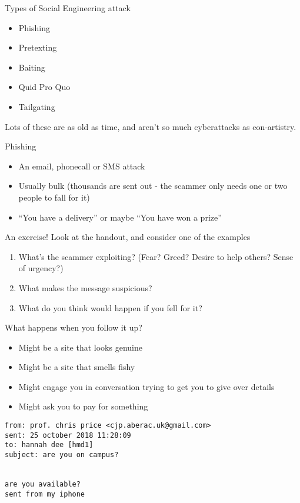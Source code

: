 \documentclass[xcolor=table]{beamer}
\begin{document}
\begin{frame}{Types of Social Engineering attack}
	\begin{itemize}
		\item Phishing
		\item Pretexting
		\item Baiting
		\item Quid Pro Quo
		\item Tailgating
	\end{itemize}
	Lots of these are as old as time, and aren't so much cyberattacks as con-artistry.
\end{frame}

\begin{frame}{Phishing}
	\begin{itemize}
		\item An email, phonecall or SMS attack
		\item Usually bulk (thousands are sent out - the scammer only needs one or two people to fall for it)
		\item ``You have a delivery'' or maybe ``You have won a prize''
	\end{itemize}
\end{frame}

\begin{frame}{An exercise!}
	Look at the handout, and consider one of the examples
	\begin{enumerate}
		\item What's the scammer exploiting? (Fear? Greed? Desire to help others? Sense of urgency?)
		\item What makes the message suspicious?
		\item What do you think would happen if you fell for it?
	\end{enumerate}

\end{frame}
\begin{frame}{What happens when you follow it up?}
	\begin{itemize}
		\item Might be a site that looks genuine
		\item Might be a site that smells fishy
		\item Might engage you in conversation trying to get you to give over details
		\item Might ask you to pay for something
	\end{itemize}
\end{frame}

\begin{frame}[fragile]
\begin{small}
	\begin{verbatim}
from: prof. chris price <cjp.aberac.uk@gmail.com>
sent: 25 october 2018 11:28:09
to: hannah dee [hmd1]
subject: are you on campus?
 

are you available?
sent from my iphone
	\end{verbatim}
\end{small}
\end{frame}
\end{document}
